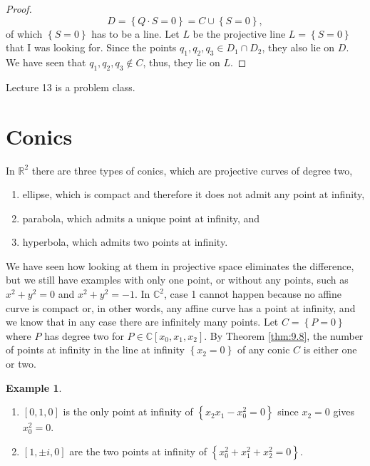 \documentclass{article}
\newcommand{\R}{\mathbb{R}}
\newcommand{\C}{\mathbb{C}}
\renewcommand{\sb}[1]{\left[ #1 \right]}
\newcommand{\cb}[1]{\left\{ #1 \right\}}
\theoremstyle{definition}\newtheorem{definition}{Definition}[section]
\theoremstyle{definition}\newtheorem{notation}[definition]{Notation}
\theoremstyle{definition}\newtheorem{remark}[definition]{Remark}
\theoremstyle{definition}\newtheorem{example}[definition]{Example}
\theoremstyle{definition}\newtheorem{fact}{Fact}
\theoremstyle{definition}\newtheorem{exercise}{Exercise}
\begin{document}
\begin{proof}
$$ D = \cb{Q \cdot S = 0} = C \cup \cb{S = 0}, $$
of which $ \cb{S = 0} $ has to be a line. Let $ L $ be the projective line $ L = \cb{S = 0} $ that I was looking for. Since the points $ q_1, q_2, q_3 \in D_1 \cap D_2 $, they also lie on $ D $. We have seen that $ q_1, q_2, q_3 \notin C $, thus, they lie on $ L $.
\end{proof}


Lecture 13 is a problem class.


\section{Conics}

In $ \R^2 $ there are three types of conics, which are projective curves of degree two,
\begin{enumerate}
\item ellipse, which is compact and therefore it does not admit any point at infinity,
\item parabola, which admits a unique point at infinity, and
\item hyperbola, which admits two points at infinity.
\end{enumerate}
We have seen how looking at them in projective space eliminates the difference, but we still have examples with only one point, or without any points, such as $ x^2 + y^2 = 0 $ and $ x^2 + y^2 = -1 $. In $ \C^2 $, case 1 cannot happen because no affine curve is compact or, in other words, any affine curve has a point at infinity, and we know that in any case there are infinitely many points. Let $ C = \cb{P = 0} $ where $ P $ has degree two for $ P \in \C\sb{x_0, x_1, x_2} $. By Theorem \ref{thm:9.8}, the number of points at infinity in the line at infinity $ \cb{x_2 = 0} $ of any conic $ C $ is either one or two.

\begin{example}
\hfill
\begin{enumerate}
\item $ \sb{0, 1, 0} $ is the only point at infinity of $ \cb{x_2x_1 - x_0^2 = 0} $ since $ x_2 = 0 $ gives $ x_0^2 = 0 $.
\item $ \sb{1, \pm i, 0} $ are the two points at infinity of $ \cb{x_0^2 + x_1^2 + x_2^2 = 0} $.
\end{enumerate}
\end{example}
\end{document}
